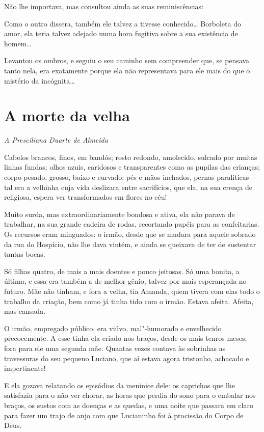 Não lhe importava, mas consultou ainda as suas reminiscências:

Como o outro dissera, também ele talvez a tivesse conhecido\ldots{} Borboleta
do amor, ela teria talvez adejado numa hora fugitiva sobre a sua
existência de homem\ldots{}

Levantou os ombros, e seguiu o seu caminho sem compreender que, se
pensava tanto nela, era exatamente porque ela não representava para ele
mais do que o mistério da incógnita\ldots{}

\chapter{A morte da velha}

\hfill{}\emph{A Presciliana Duarte de Almeida}

\bigskip

Cabelos brancos, finos, em bandós; rosto redondo, amolecido, sulcado por
muitas linhas fundas; olhos azuis, caridosos e transparentes como as
pupilas das crianças; corpo pesado, grosso, baixo e curvado; pés e mãos
inchados, pernas paralíticas --- tal era a velhinha cuja vida deslizara
entre sacrifícios, que ela, na sua crença de religiosa, espera ver
transformados em flores no céu!

Muito surda, mas extraordinariamente bondosa e ativa, ela não parava de
trabalhar, na sua grande cadeira de rodas, recortando papéis para as
confeitarias. Os recursos eram minguados: o irmão, desde que se mudara
para aquele sobrado da rua do Hospício, não lhe dava vintém, e ainda se
queixava de ter de sustentar tantas bocas.

Só filhas quatro, de mais a mais doentes e pouco jeitosas. Só uma
bonita, a última, e essa era também a de melhor gênio, talvez por mais
esperançada no futuro. Mãe não tinham, e fora a velha, tia Amanda, quem
tivera com elas todo o trabalho da criação, bem como já tinha tido com o
irmão. Estava afeita. Afeita, mas cansada.

O irmão, empregado público, era viúvo, mal"-humorado e envelhecido
precocemente. A esse tinha ela criado nos braços, desde os mais tenros
meses; fora para ele uma segunda mãe. Quantas vezes contava às sobrinhas
as travessuras do seu pequeno Luciano, que aí estava agora tristonho,
achacado e impertinente!

E ela gozava relatando os episódios da meninice dele: os caprichos que
lhe satisfazia para o não ver chorar, as horas que perdia do sono para o
embalar nos braços, os sustos com as doenças e as quedas, e uma noite
que passara em claro para fazer um trajo de anjo com que Lucianinho foi
à procissão do Corpo de Deus.

